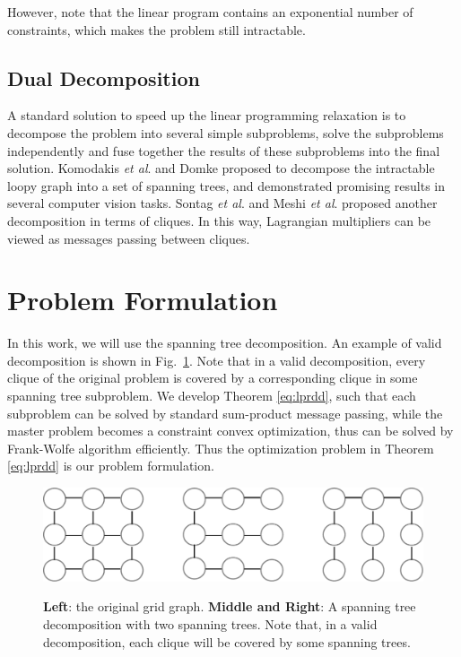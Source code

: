 \documentclass[conference]{IEEEtran}
\def\etal{\emph{et al}. }
\begin{document}
However, note that the linear program contains an exponential number of constraints, which makes the problem still intractable.

\subsection{Dual Decomposition}

A standard solution to speed up the linear programming relaxation is to decompose the problem into several simple subproblems, solve the subproblems independently and fuse together the results of these subproblems into the final solution. Komodakis \etal \cite{Komodakis07} and Domke \cite{Domke11} proposed to decompose the intractable loopy graph into a set of spanning trees, and demonstrated promising results in several computer vision tasks. Sontag \etal \cite{Sontag10} and Meshi \etal \cite{Meshi10} proposed another decomposition in terms of cliques. In this way, Lagrangian multipliers can be viewed as messages passing between cliques. 

\section{Problem Formulation}


In this work, we will use the spanning tree decomposition. An example of valid decomposition is shown in Fig.~\ref{fig:trees}. Note that in a valid decomposition, every clique of the original problem is covered by a corresponding clique in some spanning tree subproblem. We develop Theorem \ref{eq:lprdd}, such that each subproblem can be solved by standard sum-product message passing, while the master problem becomes a constraint convex optimization, thus can be solved by Frank-Wolfe algorithm efficiently. Thus the optimization problem in Theorem \ref{eq:lprdd} is our problem formulation.

\begin{figure}
	\centering
	\includegraphics[width=0.8\linewidth]{img/0521.pdf} \\
	\caption{\textbf{Left}: the original grid graph. \textbf{Middle and Right}: A spanning tree decomposition with two spanning trees. Note that, in a valid decomposition, each clique will be covered by some spanning trees.}
\label{fig:trees}
\end{figure}
\end{document}
